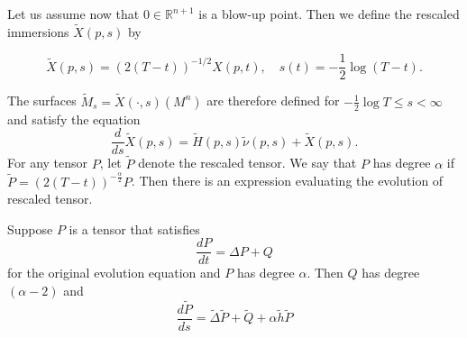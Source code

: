 Let us assume now that $0 \in \mathbb{R}^{n+1}$ is a blow-up point. Then we define the rescaled immersions $\tilde{X}(p, s)$ by

\begin{equation}
    \tilde{X}(p, s)=(2(T-t))^{-1 / 2} X(p, t), \quad s(t)=-\frac{1}{2} \log (T-t) .\label{rescaling}
\end{equation}

The surfaces $\tilde{M}_s=\tilde{X}(\cdot, s)\left(M^n\right)$ are therefore defined for $-\frac{1}{2} \log T \leq s<\infty$ and satisfy the equation
$$
\frac{d}{d s} \tilde{X}(p, s)=\tilde{H}(p, s) \tilde{\nu}(p,s)+\tilde{X}(p, s).
$$
For any tensor $ P $, let $ \tilde{P} $ denote the rescaled tensor. We say that $ P $ has degree $ \alpha $ if $ \tilde{P} = (2(T-t))^{- \frac{\alpha}{2}}P $. Then there is an expression evaluating the evolution of rescaled tensor.
\begin{lemma}
    Suppose $P$ is a tensor that satisfies $$ \frac{dP}{dt}=\Delta P+Q$$ for the original evolution equation and $P$ has degree $\alpha$. Then $Q$ has degree $(\alpha-2)$ and 
    \[  \frac{d \tilde{P}}{ds}=\tilde{\Delta} \tilde{P}+\tilde{Q}+{\alpha} \tilde{h}\tilde{P} \]
    
\end{lemma}

